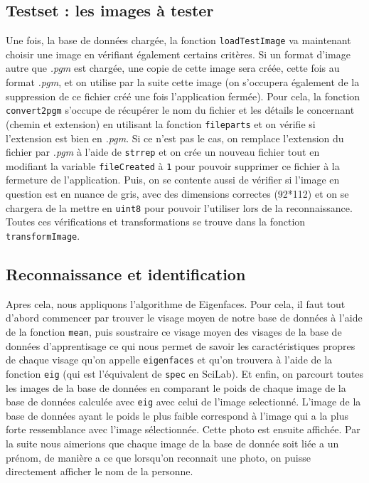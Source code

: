 \documentclass[12pt,a4paper]{article}
\begin{document}
\subsection{Testset : les images à tester}
Une fois, la base de données chargée, la fonction \texttt{loadTestImage} va maintenant choisir une image en vérifiant également certains critères. Si un format d’image autre que \textit{.pgm} est chargée, une copie de cette image sera créée, cette fois au format \textit{.pgm}, et on utilise par la suite cette image (on s'occupera également de la suppression de ce fichier créé une fois l'application fermée). Pour cela, la fonction \texttt{convert2pgm} s'occupe de récupérer le nom du fichier et les détails le concernant (chemin et extension) en utilisant la fonction \texttt{fileparts} et on vérifie si l'extension est bien en \textit{.pgm}. Si ce n'est pas le cas, on remplace l'extension du fichier par \textit{.pgm} à l'aide de \texttt{strrep} et on crée un nouveau fichier tout en modifiant la variable \texttt{fileCreated} à \texttt{1} pour pouvoir supprimer ce fichier à la fermeture de l'application. 
\newline
Puis, on se contente aussi de vérifier si l'image en question est en nuance de gris, avec des dimensions correctes (92*112) et on se chargera de la mettre en \texttt{uint8} pour pouvoir l'utiliser lors de la reconnaissance. Toutes ces vérifications et transformations se trouve dans la fonction \texttt{transformImage}.

\subsection{Reconnaissance et identification}
Apres cela, nous appliquons l’algorithme de Eigenfaces. Pour cela, il faut tout d'abord commencer par trouver le visage moyen de notre base de données à l'aide de la fonction \texttt{mean}, puis soustraire ce visage moyen des visages de la base de données d'apprentisage ce qui nous permet de savoir les caractéristiques propres de chaque visage qu'on appelle \texttt{eigenfaces} et qu'on trouvera à l'aide de la fonction \texttt{eig} (qui est l'équivalent de \texttt{spec} en SciLab). Et enfin, on parcourt toutes les images de la base de données en comparant le poids de chaque image de la base de données calculée avec \texttt{eig} avec celui de l'image selectionné. L'image de la base de données ayant le poids le plus faible correspond à l'image qui a la plus forte ressemblance avec l'image sélectionnée. Cette photo est ensuite affichée. Par la suite nous aimerions que chaque image de la base de donnée soit liée a un prénom, de manière a ce que lorsqu’on reconnait une photo, on puisse directement afficher le nom de la personne.
\end{document}
